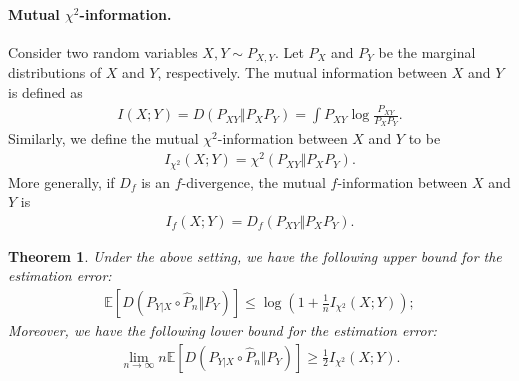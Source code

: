 \documentclass{article}
\numberwithin{equation}{section}
\newcommand{\E}{\mathbb{E}}
\newcommand{\wh}{\widehat}
\theoremstyle{plain}
\newtheorem{theorem}{Theorem}[section]
\theoremstyle{definition}
\begin{document}
\paragraph{Mutual $\chi^2$-information.} Consider two random variables $X,Y\sim P_{X,Y}$. Let $P_X$ and $P_Y$ be the marginal distributions of $X$ and $Y$, respectively. The mutual information between $X$ and $Y$ is defined as
\begin{align*}
	I(X;Y)=D\left(P_{XY}\Vert P_XP_Y\right)=\int P_{XY}\log\frac{P_{XY}}{P_XP_Y}.
\end{align*}
Similarly, we define the mutual $\chi^2$-information between $X$ and $Y$ to be
\begin{align*}
	I_{\chi^2}(X;Y)=\chi^2\left(P_{XY}\Vert P_XP_Y\right).
\end{align*}
More generally, if $D_f$ is an $f$-divergence, the mutual $f$-information between $X$ and $Y$ is
\begin{align*}
	I_f(X;Y)=D_f\left(P_{XY}\Vert P_XP_Y\right).
\end{align*}
\begin{theorem}\label{kdeconvg}
Under the above setting, we have the following upper bound for the estimation error:
\begin{align*}
	\E\left[D(P_{Y|X}\circ\wh{P}_n\Vert P_Y)\right]\leq\log\left(1+\frac{1}{n}I_{\chi^2}(X;Y)\right);
\end{align*}
Moreover, we have the following lower bound for the estimation error:
\begin{align*}
	\lim_{n\to\infty} n\E\left[D(P_{Y|X}\circ\wh{P}_n\Vert P_Y)\right]\geq\frac{1}{2}I_{\chi^2}(X;Y).
\end{align*}
\end{theorem}
\end{document}
